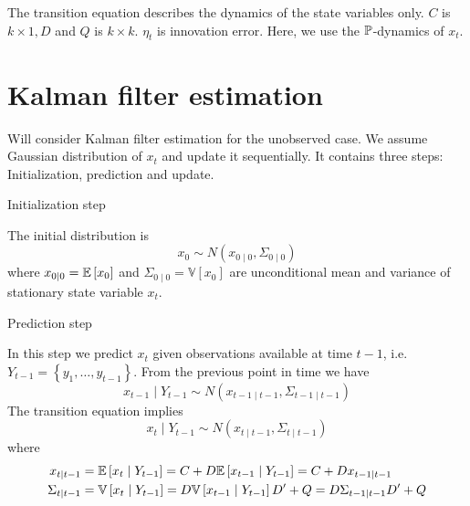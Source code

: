 The transition equation describes the dynamics of the state variables only. $C$ is $k \times 1, D$
and $Q$ is $k \times k$. $\eta_{t}$ is innovation error. Here, we use the $\P$-dynamics of $x_{t}$.

\section{Kalman filter estimation}
Will consider Kalman filter estimation for the unobserved case. We assume Gaussian distribution of
$x_{t}$ and update it sequentially. It contains three steps: Initialization, prediction and
update.

\begin{description}
\item[Initialization step] 
\end{description}
The initial distribution is
\[
x_{0} \sim N\left(x_{0 \mid 0}, \Sigma_{0 \mid 0}\right)
\]
where $x_{0 \mid 0}=\E\left[x_{0}\right]$ and $\Sigma_{0 \mid 0}=\mathbb{V}\left[x_{0}\right]$ are
unconditional mean and variance of stationary state variable $x_{t}$.
\begin{description}
\item[Prediction step] 
\end{description}
 In this step we predict $x_{t}$ given observations available at time $t-1$, i.e.
 $Y_{t-1}=\left\{y_{1}, \ldots, y_{t-1}\right\}$. From the previous point in time we have
\[
x_{t-1} \mid Y_{t-1} \sim N\left(x_{t-1 \mid t-1}, \Sigma_{t-1 \mid t-1}\right)
\]
The transition equation implies
\[
x_{t} \mid Y_{t-1} \sim N\left(x_{t \mid t-1}, \Sigma_{t \mid t-1}\right)
\]
where
\begin{align*}
x_{t \mid t-1} & =\E\left[x_{t} \mid Y_{t-1}\right]=C+D \E\left[x_{t-1} \mid Y_{t-1}\right]=C+D x_{t-1 \mid t-1} \\
\Sigma_{t \mid t-1} & =\mathbb{V}\left[x_{t} \mid Y_{t-1}\right]=D \mathbb{V}\left[x_{t-1} \mid Y_{t-1}\right] D^{\prime}+Q=D \Sigma_{t-1 \mid t-1} D^{\prime}+Q
\end{align*}

